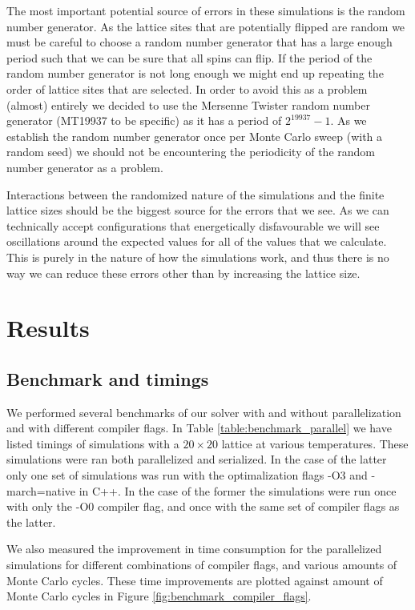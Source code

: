 \documentclass[reprint,english,notitlepage]{revtex4-1}  %
\begin{document}
The most important potential source of errors in these simulations is the random number generator. As the lattice sites that are potentially flipped are random we must be careful to choose a random number generator that has a large enough period such that we can be sure that all spins can flip. If the period of the random number generator is not long enough we might end up repeating the order of lattice sites that are selected. In order to avoid this as a problem (almost) entirely we decided to use the Mersenne Twister random number generator \citep{MersenneTwister} (MT19937 to be specific) as it has a period of $2^{19937}-1$. As we establish the random number generator once per Monte Carlo sweep (with a random seed) we should not be encountering the periodicity of the random number generator as a problem.

Interactions between the randomized nature of the simulations and the finite lattice sizes should be the biggest source for the errors that we see. As we can technically accept configurations that energetically disfavourable we will see oscillations around the expected values for all of the values that we calculate. This is purely in the nature of how the simulations work, and thus there is no way we can reduce these errors other than by increasing the lattice size. 



\newpage

\section{Results} \label{sec:IV}

\subsection{Benchmark and timings} \label{sec:IV:A}

We performed several benchmarks of our solver with and without parallelization and with different compiler flags. In Table \ref{table:benchmark_parallel} we have listed timings of simulations with a $20 \times 20$ lattice at various temperatures. These simulations were ran both parallelized and serialized. In the case of the latter only one set of simulations was run with the optimalization flags -O3 and -march=native in C++. In the case of the former the simulations were run once with only the -O0 compiler flag, and once with the same set of compiler flags as the latter.

We also measured the improvement in time consumption for the parallelized simulations for different combinations of compiler flags, and various amounts of Monte Carlo cycles. These time improvements are plotted against amount of Monte Carlo cycles in Figure \ref{fig:benchmark_compiler_flags}.
\end{document}
